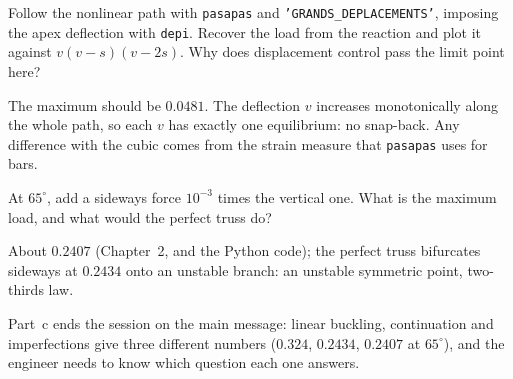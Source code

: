 \qc Follow the nonlinear path with \texttt{pasapas} and \texttt{'GRANDS\_DEPLACEMENTS'}, imposing the
apex deflection with \texttt{depi}. Recover the load from the reaction and plot it against
$v(v - s)(v - 2s)$. Why does displacement control pass the limit point here?
\begin{answer}
The maximum should be $0.0481$. The deflection $v$ increases monotonically along the whole
path, so each $v$ has exactly one equilibrium: no snap-back. Any difference with the cubic comes
from the strain measure that \texttt{pasapas} uses for bars.
\end{answer}

\qc At $65^\circ$, add a sideways force $10^{-3}$ times the vertical one. What is the maximum
load, and what would the perfect truss do?
\begin{answer}
About $0.2407$ (Chapter~2, and the Python code); the perfect truss bifurcates sideways at
$0.2434$ onto an unstable branch: an unstable symmetric point, two-thirds law.
\end{answer}

\begin{instructor}
Part~c ends the session on the main message: linear buckling, continuation and
imperfections give three different numbers ($0.324$, $0.2434$, $0.2407$ at $65^\circ$), and the
engineer needs to know which question each one answers.
\end{instructor}
